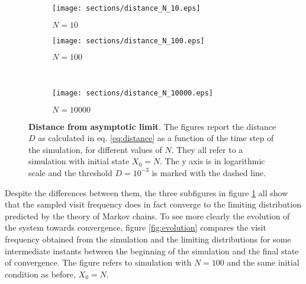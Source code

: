 \begin{figure}
    \begin{subfigure}{.5\textwidth}
        \centering
        \texttt{[image: sections/distance\_N\_10.eps]}
        \caption{$N = 10$}
      \end{subfigure}
      \begin{subfigure}{.5\textwidth}
        \centering
        \texttt{[image: sections/distance\_N\_100.eps]}
        \caption{$N = 100$}
      \end{subfigure}\\
      \begin{center}
      \begin{subfigure}{0.5\textwidth}
        \centering
        \texttt{[image: sections/distance\_N\_10000.eps]}
        \caption{$N = 10000$}
      \end{subfigure}%
    \end{center}

    \captionsetup{width=.9\linewidth}
    \caption{\textbf{Distance from asymptotic limit}. The figures report the distance $D$ as calculated in eq. \ref{eq:distance} as a function of the time step of the simulation, for different values of $N$. They all refer to a simulation with initial state $X_0 = N$. The y axis is in logarithmic scale and the threshold $D = 10^{-3}$ is marked with the dashed line.}
    \label{fig:distances}
\end{figure}

Despite the differences between them, the three subfigures in figure \ref{fig:distances} all show that the sampled visit frequency does in fact converge to the limiting distribution predicted by the theory of Markov chains. To see more clearly the evolution of the system towards convergence, figure \ref{fig:evolution} compares the visit frequency obtained from the simulation and the limiting distributions for some intermediate instants between the beginning of the simulation and the final state of convergence. The figure refers to simulation with $N = 100$ and the same initial condition as before, \ie $X_0 = N$. 

